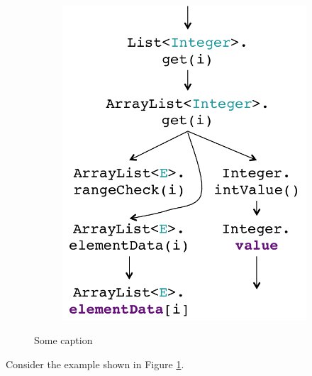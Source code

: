 \begin{figure}[h]
\begin{subfigure}[b]{0.48\textwidth}
  \includegraphics[width=\textwidth]{figures/example-flow.pdf}
  \caption{}
 \end{subfigure}%
 \caption{Some caption}
 \label{fig:mot-example}
\end{figure}
Consider the example shown in Figure \ref{fig:mot-example}.